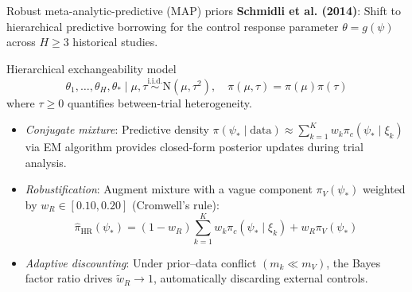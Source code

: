\documentclass[t]{beamer}
\begin{document}
\begin{frame}{Robust meta-analytic-predictive (MAP) priors}
    \vspace{-0.15cm}
    \textbf{Schmidli et al. (2014)}: Shift to hierarchical predictive borrowing for the control response parameter $\theta = g(\psi)$ across $H \ge 3$ historical studies.

    \begin{block}{Hierarchical exchangeability model}
    \begin{equation*}
        \theta_1, \dots, \theta_H, \theta_* \mid \mu, \tau \overset{\text{i.i.d.}}{\sim} \text{N}(\mu, \tau^2), \quad \pi(\mu, \tau) = \pi(\mu)\pi(\tau)
    \end{equation*}
    where $\tau \ge 0$ quantifies between-trial heterogeneity.
    \end{block}

    \begin{itemize}
        \item \emph{Conjugate mixture}: Predictive density $\pi(\psi_* \mid \text{data}) \approx \sum_{k=1}^K w_k \pi_c(\psi_* \mid \xi_k)$ via EM algorithm provides closed-form posterior updates during trial analysis.
        \item \emph{Robustification}: Augment mixture with a vague component $\pi_V(\psi_*)$ weighted by $w_R \in [0.10, 0.20]$ (Cromwell's rule):
        \begin{equation*}
            \hat\pi_{\text{HR}}(\psi_*) = (1 - w_R) \sum_{k=1}^K w_k \pi_c(\psi_* \mid \xi_k) + w_R \pi_V(\psi_*)
        \end{equation*}
        \item \emph{Adaptive discounting}: Under prior--data conflict $(m_k \ll m_V)$, the Bayes factor ratio drives $\tilde{w}_R \to 1$, automatically discarding external controls.
    \end{itemize}
\end{frame}
\end{document}
